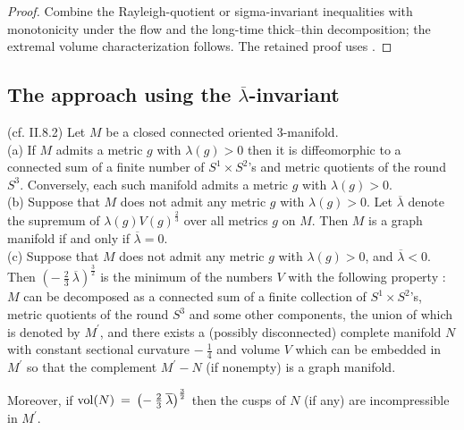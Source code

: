 \begin{proof}
\sketch Combine the Rayleigh-quotient or sigma-invariant inequalities with monotonicity under the flow and the long-time thick--thin decomposition; the extremal volume characterization follows.
The retained proof uses \cite[Pf. of Theorem 2.9]{Anderson}.
\end{proof}

\subsection{The approach using the $\overline{\lambda}$-invariant}

\begin{proposition}
  \label{prop:kl-alternative-proof-cusp-incompressibility-characterization-graph-manifolds-2}
 (cf. II.8.2) \label{propII.8.2}
Let $M$ be a closed connected oriented $3$-manifold. \\
(a) If $M$ admits a metric $g$ with $\lambda(g) > 0$ then it is
diffeomorphic to a connected sum of a finite number of
$S^1 \times S^2$'s and metric quotients of the round $S^3$.
Conversely, each such manifold admits a metric $g$ with
$\lambda(g) > 0$. \\
(b) Suppose that $M$ does not admit any metric $g$ with
$\lambda(g) > 0$. Let $\overline{\lambda}$ denote the
supremum of $\lambda(g) V(g)^{\frac23}$ over all metrics $g$ on $M$.
Then $M$ is a graph manifold if and only if $\overline{\lambda}
= 0$. \\
(c) Suppose that $M$ does not admit any metric $g$ with
$\lambda(g) > 0$, and $\overline{\lambda} < 0$.
Then
$\left( - \: \frac23 \: \overline{\lambda}
\right)^{\frac32}$ is the minimum
of the numbers
$V$ with the following property : $M$ can be decomposed as a connected sum
of a finite collection of $S^1 \times S^2$'s, metric quotients of the round
$S^3$ and some other components, the union of which is denoted by
$M^\prime$, and there exists a (possibly disconnected) complete
manifold $N$ with constant sectional curvature $- \: \frac14$ and
volume $V$ which can be embedded in $M^\prime$ so that the
complement $M^\prime - N$ (if nonempty) is a graph manifold.

Moreover, if
$\operatorname{vol}(N) \: = \: \left( - \: \frac23 \: \overline{\lambda}
\right)^{\frac32}$
then the cusps of $N$ (if any) are incompressible in $M^\prime$.
\end{proposition}

